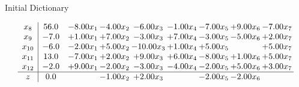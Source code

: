 \documentclass[8pt]{article}
\begin{document}
Initial Dictionary 

\[\begin{array}{c| c c@{\hskip 2pt} c@{\hskip 2pt} c@{\hskip 2pt} c@{\hskip 2pt} c@{\hskip 2pt} c@{\hskip 2pt} c@{\hskip 2pt} }
 x_{8}   &  56.0 & -8.00 x_{1} & -4.00 x_{2} & -6.00 x_{3} & -1.00 x_{4} & -7.00 x_{5} & +  9.00 x_{6} & -7.00 x_{7}\\
 x_{9}   &  -7.0 & +  1.00 x_{1} & +  7.00 x_{2} & -3.00 x_{3} & +  7.00 x_{4} & -3.00 x_{5} & -5.00 x_{6} & +  2.00 x_{7}\\
 x_{10}   &  -6.0 & -2.00 x_{1} & +  5.00 x_{2} & -10.00 x_{3} & +  1.00 x_{4} & +  5.00 x_{5} &   & +  5.00 x_{7}\\
 x_{11}   &  13.0 & -7.00 x_{1} & +  2.00 x_{2} & +  9.00 x_{3} & +  6.00 x_{4} & -8.00 x_{5} & +  1.00 x_{6} & +  5.00 x_{7}\\
 x_{12}   &  -2.0 & +  9.00 x_{1} & -2.00 x_{2} & -3.00 x_{3} & -4.00 x_{4} & -2.00 x_{5} & +  5.00 x_{6} & +  3.00 x_{7}\\
\hline
z    &  0.0  &   & -1.00 x_{2} & +  2.00 x_{3} &   & -2.00 x_{5} & -2.00 x_{6} &   \\
\end{array}\]
\end{document}
